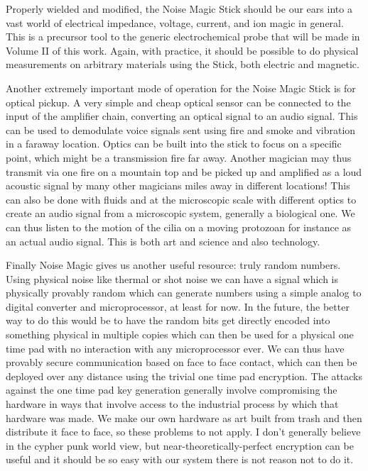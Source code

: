 Properly wielded and modified, the Noise Magic Stick should be our ears
into a vast world of electrical impedance, voltage, current, and ion
magic in general. This is a precursor tool to the generic
electrochemical probe that will be made in Volume II of this work.
Again, with practice, it should be possible to do physical measurements
on arbitrary materials using the Stick, both electric and magnetic.

Another extremely important mode of operation for the Noise Magic Stick
is for optical pickup. A very simple and cheap optical sensor can be
connected to the input of the amplifier chain, converting an optical
signal to an audio signal. This can be used to demodulate voice signals
sent using fire and smoke and vibration in a faraway location. Optics
can be built into the stick to focus on a specific point, which might be
a transmission fire far away. Another magician may thus transmit via one
fire on a mountain top and be picked up and amplified as a loud acoustic
signal by many other magicians miles away in different locations! This
can also be done with fluids and at the microscopic scale with different
optics to create an audio signal from a microscopic system, generally a
biological one. We can thus listen to the motion of the cilia on a
moving protozoan for instance as an actual audio signal. This is both
art and science and also technology.

Finally Noise Magic gives us another useful resource: truly random
numbers. Using physical noise like thermal or shot noise we can have a
signal which is physically provably random which can generate numbers
using a simple analog to digital converter and microprocessor, at least
for now. In the future, the better way to do this would be to have the
random bits get directly encoded into something physical in multiple
copies which can then be used for a physical one time pad with no
interaction with any microprocessor ever. We can thus have provably
secure communication based on face to face contact, which can then be
deployed over any distance using the trivial one time pad encryption.
The attacks against the one time pad key generation generally involve
compromising the hardware in ways that involve access to the industrial
process by which that hardware was made. We make our own hardware as art
built from trash and then distribute it face to face, so these problems
to not apply. I don't generally believe in the cypher punk world view,
but near-theoretically-perfect encryption can be useful and it should be
so easy with our system there is not reason not to do it.

